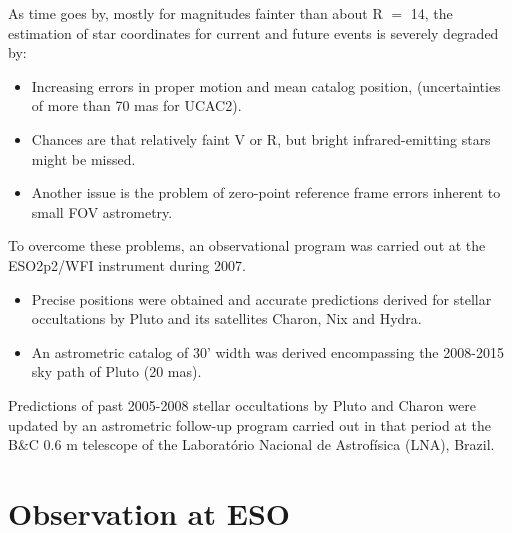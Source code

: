 \begin{frame}
	\pause
	\begin{block}{}
		As time goes by, mostly for magnitudes fainter than about R $=$ 14, the estimation of star coordinates for current and future events is severely degraded by:
	\end{block}
	\begin{itemize}
	 	\item Increasing errors in proper motion and mean catalog position, (uncertainties of more than 70 mas for UCAC2).
	 	\item Chances are that relatively faint V or R, but bright infrared-emitting stars might be missed.
	 	\item Another issue is the problem of zero-point reference frame errors inherent to small FOV astrometry.
 \end{itemize} 

\end{frame}


\begin{frame}
	\pause
	\begin{block}{}
		To overcome these problems, an observational program was carried out at the ESO2p2/WFI instrument during 2007.	
	\end{block}
	\begin{itemize}
	 	\item Precise positions were obtained and accurate predictions derived for stellar occultations by Pluto and its satellites Charon, Nix and Hydra.
	 	\item An astrometric catalog of 30' width was derived encompassing the 2008-2015 sky path of Pluto (20 mas).
 \end{itemize} 
\pause
\begin{alertblock}{}
Predictions of past 2005-2008 stellar occultations by Pluto and Charon were updated by an astrometric follow-up program carried out in that period at the B\&C 0.6 m telescope of the Laboratório Nacional de Astrofísica (LNA), Brazil.	
\end{alertblock}
\end{frame}


\section{Observation at ESO}

